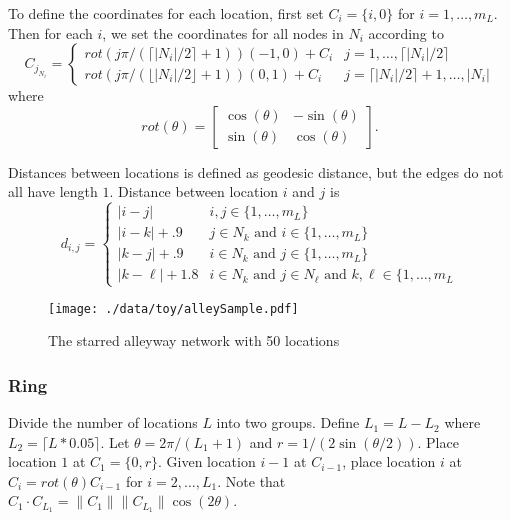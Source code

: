 \documentclass[11pt]{article}
\begin{document}
To define the coordinates for each location, first set $C_{i} =
    \lbrace i,0 \rbrace$ for $i = 1,\ldots,m_L$.  Then for each $i$,
we set the coordinates for all nodes in $N_i$ according to
\begin{equation*}
  C_{j_{N_i}} = 
  \begin{cases}
    rot(j\pi/(\lceil |N_i|/2 \rceil + 1)) (-1,0) + C_i & j = 1,\ldots,
    \lceil |N_i|/2 \rceil\\
    rot(j\pi/(\lfloor |N_i|/2 \rfloor + 1)) (0,1) + C_i & j = \lceil
    |N_i|/2 \rceil + 1,\ldots,|N_i|
  \end{cases}  
\end{equation*}
where
\begin{equation*}
rot(\theta) = \left[
\begin{matrix}
\cos(\theta) & -\sin(\theta)\\
\sin(\theta) & \cos(\theta)
\end{matrix}
\right].
\end{equation*}

Distances between locations is defined as geodesic distance, but
the edges do not all have length $1$.  Distance between location
$i$ and $j$ is
\begin{equation*}
  d_{i,j} = 
  \begin{cases}
    | i - j | & i,j \in \lbrace 1,\ldots,m_L \rbrace\\
    | i - k | + .9 & j \in N_k \text{ and } i \in \lbrace 1,\ldots,m_L
    \rbrace\\
    | k - j | + .9 & i \in N_k \text{ and } j \in \lbrace 1,\ldots,m_L
    \rbrace\\
    | k - \ell| + 1.8 & i \in N_k \text{ and } j \in N_\ell \text{ and
      } k,\ell \in \lbrace 1,\ldots,m_L
  \end{cases}
\end{equation*}


\begin{figure}[htb]
\centering
\texttt{[image: ./data/toy/alleySample.pdf]}
\caption{\label{fig:alley50}The starred alleyway network with 50 locations}
\end{figure}



\subsubsection{Ring}
\label{sec-3-1-3}

Divide the number of locations $L$ into two groups.  Define $L_1 =
    L - L_2$ where $L_2 = \lceil L*0.05 \rceil$.  Let $\theta =
    2\pi/(L_1+1)$ and $r = 1/(2\sin(\theta/2))$.  Place location $1$
at $C_1 = \lbrace 0,r \rbrace$.  Given location $i-1$ at
$C_{i-1}$, place location $i$ at $C_i = rot(\theta) C_{i-1}$ for
$i = 2,\ldots,L_1$.  Note that $C_{1} \cdot C_{L_1} = \|C_{1}\|
    \|C_{L_1}\| \cos(2\theta)$.
\end{document}

